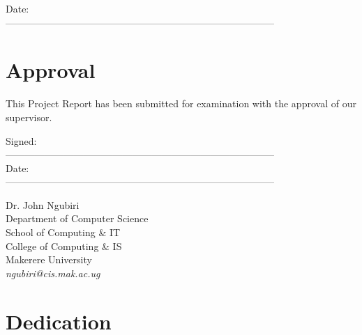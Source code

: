 \documentclass[12pt, a4paper]{report}
\begin{document}
\vspace{1.0in}

\noindent

Date: \\

-----------------------------------------------------------------------------------

\newpage


\chapter*{Approval}

This Project Report has been submitted for examination with the approval of our supervisor.


\vspace{1.0em}

\noindent

Signed: \\

-----------------------------------------------------------------------------------\\

Date: \\

-----------------------------------------------------------------------------------\\


\vspace{2.0em}


\noindent

Dr. John Ngubiri \\

Department of Computer Science\\

School of Computing \& IT\\

College of Computing \& IS\\

Makerere University\\

\emph{ngubiri@cis.mak.ac.ug}

\newpage


\chapter*{Dedication}
\end{document}
